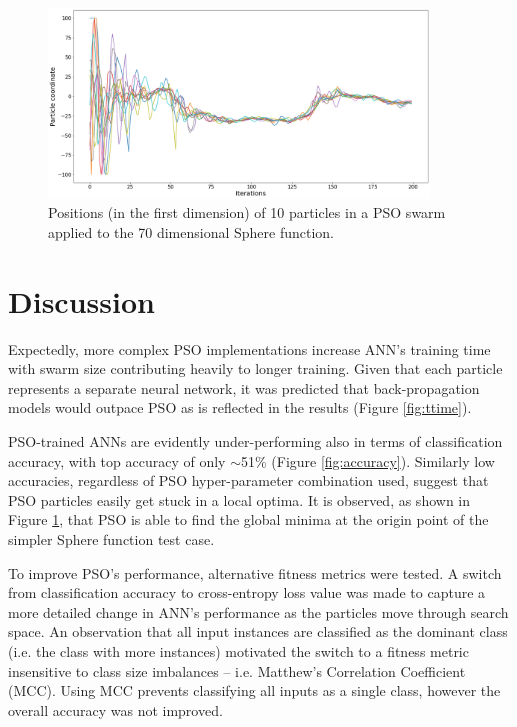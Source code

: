 \documentclass[12pt]{article}
\begin{document}
\begin{figure}[H]
  \centering
  \includegraphics[width=0.9\textwidth]{figs/sphere_pso.png}
  \vspace{-1em}
  \caption{Positions (in the first dimension) of 10 particles in a PSO swarm applied to the 70 dimensional Sphere function.}
  \label{fig:sphere}
\end{figure}

\vspace{-1.5em}
\section{Discussion}
\vspace{-1.5em}

Expectedly, more complex PSO implementations increase ANN's training time with swarm size contributing heavily to longer training. Given that each particle represents a separate neural network, it was predicted that back-propagation models would outpace PSO as is reflected in the results (Figure \ref{fig:ttime}).

PSO-trained ANNs are evidently under-performing also in terms of classification accuracy, with top accuracy of only  $\sim$51\%  (Figure \ref{fig:accuracy}). Similarly low accuracies, regardless of PSO hyper-parameter combination used, suggest that PSO particles easily get stuck in a local optima. It is observed, as shown in Figure \ref{fig:sphere}, that PSO is able to find the global minima at the origin point of the simpler Sphere function test case.

To improve PSO's performance, alternative fitness metrics were tested. A switch from classification accuracy to cross-entropy loss value was made to capture a more detailed change in ANN's performance as the particles move through search space.  An observation that all input instances are classified as the dominant class (i.e. the class with more instances) motivated the switch to a fitness metric insensitive to class size  imbalances -- i.e. Matthew's Correlation Coefficient (MCC). Using MCC prevents classifying all inputs as a single class, however the overall accuracy was not improved.
\end{document}
